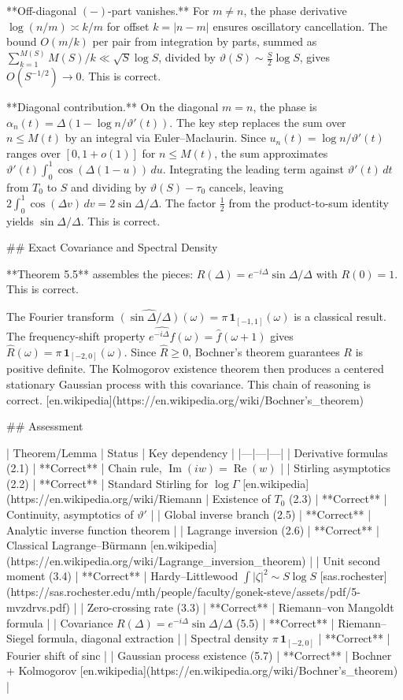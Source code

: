 **Off-diagonal \((−)\)-part vanishes.** For \(m \neq n\), the phase derivative \(\log(n/m) \asymp k/m\) for offset \(k = |n-m|\) ensures oscillatory cancellation. The bound \(O(m/k)\) per pair from integration by parts, summed as \(\sum_{k=1}^{M(S)} M(S)/k \ll \sqrt{S}\log S\), divided by \(\vartheta(S) \sim \tfrac{S}{2}\log S\), gives \(O(S^{-1/2}) \to 0\). This is correct.

**Diagonal contribution.** On the diagonal \(m = n\), the phase is \(\alpha_n(t) = \Delta(1 - \log n/\vartheta'(t))\). The key step replaces the sum over \(n \le M(t)\) by an integral via Euler–Maclaurin. Since \(u_n(t) = \log n / \vartheta'(t)\) ranges over \([0, 1+o(1)]\) for \(n \le M(t)\), the sum approximates \(\vartheta'(t)\int_0^1 \cos(\Delta(1-u))\,du\). Integrating the leading term against \(\vartheta'(t)\,dt\) from \(T_0\) to \(S\) and dividing by \(\vartheta(S) - \tau_0\) cancels, leaving \(2\int_0^1 \cos(\Delta v)\,dv = 2\sin\Delta/\Delta\). The factor \(\tfrac{1}{2}\) from the product-to-sum identity yields \(\sin\Delta/\Delta\). This is correct.

## Exact Covariance and Spectral Density

**Theorem 5.5** assembles the pieces: \(R(\Delta) = e^{-i\Delta}\sin\Delta/\Delta\) with \(R(0) = 1\). This is correct.

The Fourier transform \(\widehat{(\sin\Delta/\Delta)}(\omega) = \pi\,\mathbf{1}_{[-1,1]}(\omega)\) is a classical result. The frequency-shift property \(\widehat{e^{-i\Delta}f}(\omega) = \hat{f}(\omega+1)\) gives \(\widehat{R}(\omega) = \pi\,\mathbf{1}_{[-2,0]}(\omega)\). Since \(\widehat{R} \ge 0\), Bochner's theorem guarantees \(R\) is positive definite. The Kolmogorov existence theorem then produces a centered stationary Gaussian process with this covariance. This chain of reasoning is correct. [en.wikipedia](https://en.wikipedia.org/wiki/Bochner's_theorem)

## Assessment

| Theorem/Lemma | Status | Key dependency |
|---|---|---|
| Derivative formulas (2.1) | **Correct** | Chain rule, \(\operatorname{Im}(iw)=\operatorname{Re}(w)\) |
| Stirling asymptotics (2.2) | **Correct** | Standard Stirling for \(\log\Gamma\)  [en.wikipedia](https://en.wikipedia.org/wiki/Riemann%
| Existence of \(T_0\) (2.3) | **Correct** | Continuity, asymptotics of \(\vartheta'\) |
| Global inverse branch (2.5) | **Correct** | Analytic inverse function theorem |
| Lagrange inversion (2.6) | **Correct** | Classical Lagrange–Bürmann  [en.wikipedia](https://en.wikipedia.org/wiki/Lagrange_inversion_theorem) |
| Unit second moment (3.4) | **Correct** | Hardy–Littlewood \(\int|\zeta|^2 \sim S\log S\)  [sas.rochester](https://sas.rochester.edu/mth/people/faculty/gonek-steve/assets/pdf/5-mvzdrvs.pdf) |
| Zero-crossing rate (3.3) | **Correct** | Riemann–von Mangoldt formula |
| Covariance \(R(\Delta) = e^{-i\Delta}\sin\Delta/\Delta\) (5.5) | **Correct** | Riemann–Siegel formula, diagonal extraction |
| Spectral density \(\pi\,\mathbf{1}_{[-2,0]}\) | **Correct** | Fourier shift of sinc |
| Gaussian process existence (5.7) | **Correct** | Bochner + Kolmogorov  [en.wikipedia](https://en.wikipedia.org/wiki/Bochner's_theorem) |


